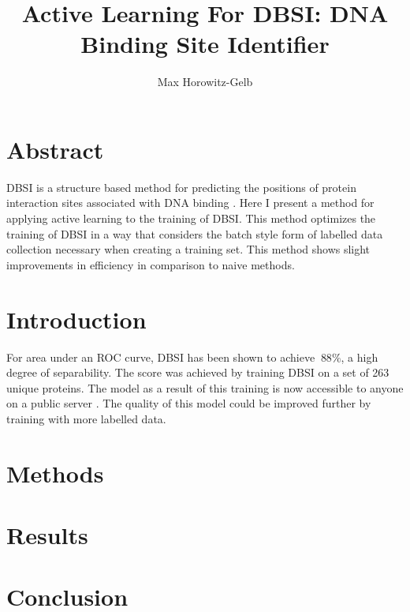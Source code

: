 \documentclass{article}
\begin{document}
\author{Max Horowitz-Gelb}
\title{Active Learning For DBSI: DNA Binding Site Identifier }
\maketitle

\section*{Abstract}
DBSI is a structure based method for predicting the positions of protein interaction sites associated with DNA binding \cite{dbsi}. Here I present a method for applying active learning to the training of DBSI. This method optimizes the training of DBSI in a way that considers the batch style form of labelled data collection necessary when creating a training set. This method shows slight improvements in efficiency in comparison to naive methods. 
\section*{Introduction}
For area under an ROC curve, DBSI has been shown to achieve $~88\%$, a high degree of separability. The score was achieved by training DBSI on a set of 263 unique proteins. The model as a result of this training is now accessible to anyone on a public server \cite{dbsi_server}. The quality of this model could be improved further by training with more labelled data.  
\section*{Methods}
\cite{active_learning}
\section*{Results}
\section*{Conclusion}

{}

\end{document}
